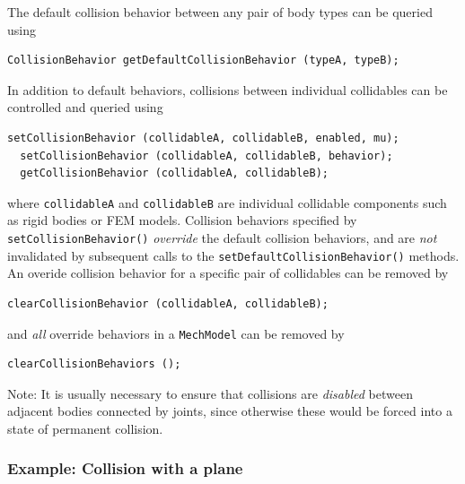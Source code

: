 The default collision behavior between any pair of body types can
be queried using
%
\begin{lstlisting}[]
  CollisionBehavior getDefaultCollisionBehavior (typeA, typeB);
\end{lstlisting}
%

In addition to default behaviors, collisions between individual
collidables can be controlled and queried using
%
\begin{lstlisting}[]
  setCollisionBehavior (collidableA, collidableB, enabled, mu);
  setCollisionBehavior (collidableA, collidableB, behavior);
  getCollisionBehavior (collidableA, collidableB);
\end{lstlisting}
%
where {\tt collidableA} and {\tt collidableB} are individual
collidable components such as rigid bodies or FEM models.  Collision
behaviors specified by {\tt setCollisionBehavior()} {\it override} the
default collision behaviors, and are {\it not} invalidated by
subsequent calls to the {\tt setDefaultCollisionBehavior()} methods.
An overide collision behavior for a specific pair of collidables
can be removed by
%
\begin{lstlisting}[]
  clearCollisionBehavior (collidableA, collidableB);
\end{lstlisting}
%
and {\it all} override behaviors in a {\tt MechModel} can
be removed by 
%
\begin{lstlisting}[]
  clearCollisionBehaviors ();
\end{lstlisting}
%

\begin{sideblock}
Note: It is usually necessary to ensure that collisions are {\it disabled}
between adjacent bodies connected by joints, since otherwise these
would be forced into a state of permanent collision.
\end{sideblock}

\subsubsection{Example: Collision with a plane}
\label{JointedCollide:sec}

